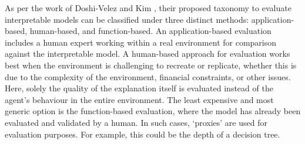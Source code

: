 As per the work of Doshi-Velez and Kim \cite{doshi2017towards}, their proposed taxonomy to evaluate interpretable models can be classified under three distinct methods: application-based, human-based, and function-based. An application-based evaluation includes a human expert working within a real environment for comparison against the interpretable model. A human-based approach for evaluation works best when the environment is challenging to recreate or replicate, whether this is due to the complexity of the environment, financial constraints, or other issues. Here, solely the quality of the explanation itself is evaluated instead of the agent's behaviour in the entire environment. The least expensive and most generic option is the function-based evaluation, where the model has already been evaluated and validated by a human. In such cases, `proxies' are used for evaluation purposes. For example, this could be the depth of a decision tree.